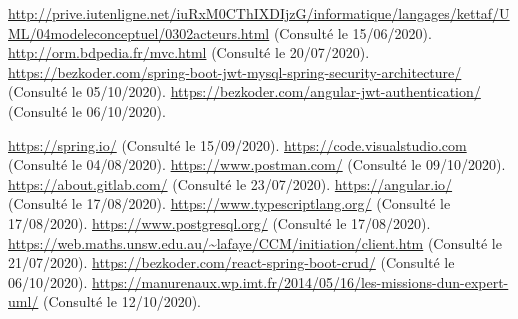 \renewcommand\bibname{Webographie}
\begin{thebibliography}{20}
 \url{ http://prive.iutenligne.net/iuRxM0CThIXDIjzG/informatique/langages/kettaf/UML/04modeleconceptuel/0302acteurs.html} (Consulté le 15/06/2020).
 \url{ http://orm.bdpedia.fr/mvc.html} (Consulté le 20/07/2020).
 \url{ https://bezkoder.com/spring-boot-jwt-mysql-spring-security-architecture/} (Consulté le 05/10/2020).
 \url{  https://bezkoder.com/angular-jwt-authentication/} (Consulté le 06/10/2020).

 \url{  https://spring.io/} (Consulté le 15/09/2020).
 \url{ https://code.visualstudio.com} (Consulté le 04/08/2020).
 \url{  https://www.postman.com/} (Consulté le 09/10/2020).
 \url{https://about.gitlab.com/} (Consulté le 23/07/2020).
 \url{ https://angular.io/} (Consulté le 17/08/2020).
 \url{  https://www.typescriptlang.org/} (Consulté le 17/08/2020).
 \url{  https://www.postgresql.org/} (Consulté le 17/08/2020).
 \url{https://web.maths.unsw.edu.au/~lafaye/CCM/initiation/client.htm} (Consulté le 21/07/2020).
 \url{https://bezkoder.com/react-spring-boot-crud/} (Consulté le 06/10/2020).
 \url{https://manurenaux.wp.imt.fr/2014/05/16/les-missions-dun-expert-uml/} (Consulté le 12/10/2020).
\end{thebibliography}